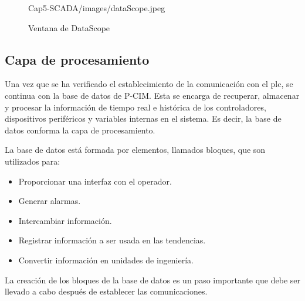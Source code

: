 \begin{itemize}
\begin{figure}[!ht]
	{Cap5-SCADA/images/dataScope.jpeg}
	\caption{Ventana de DataScope}
	\label{fig:dataScope}
  \end{figure}
\end{itemize}


\subsection{Capa de procesamiento}
\label{subsec:CapaProcesamiento}
Una vez que se ha verificado el establecimiento de la comunicación 
con el \gls{plc}, se continua con la base de datos de P-CIM. Esta se encarga 
de recuperar, almacenar y procesar la información de tiempo real e histórica de 
los controladores, dispositivos periféricos y variables internas en el sistema. 
Es decir, la base de datos conforma la capa de procesamiento.

La base de datos está formada por elementos, llamados bloques, que son
utilizados para:
\begin{itemize}
 \item Proporcionar una interfaz con el operador.
 \item Generar alarmas.
 \item Intercambiar información.
 \item Registrar información a ser usada en las tendencias.
 \item Convertir información en unidades de ingeniería.
\end{itemize}
La creación de los bloques de la base de datos es un paso importante que 
debe ser llevado a cabo después de establecer las comunicaciones.

